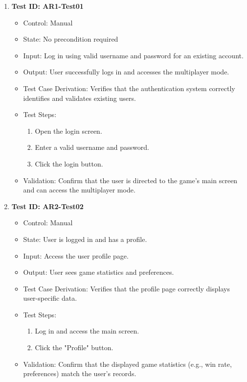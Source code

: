 \documentclass[12pt, titlepage]{article}
\begin{document}
\begin{enumerate}
    \item \textbf{Test ID: AR1-Test01}
        \begin{itemize}
            \item Control: Manual
            \item State: No precondition required
            \item Input: Log in using valid username and password for an existing account.
            \item Output: User successfully logs in and accesses the multiplayer mode.
            \item Test Case Derivation: Verifies that the authentication system correctly identifies and validates existing users.
            \item Test Steps:
                \begin{enumerate}
                    \item Open the login screen.
                    \item Enter a valid username and password.
                    \item Click the login button.
                \end{enumerate}
            \item Validation: Confirm that the user is directed to the game’s main screen and can access the multiplayer mode.
        \end{itemize}

    \item \textbf{Test ID: AR2-Test02}
        \begin{itemize}
            \item Control: Manual
            \item State: User is logged in and has a profile.
            \item Input: Access the user profile page.
            \item Output: User sees game statistics and preferences.
            \item Test Case Derivation: Verifies that the profile page correctly displays user-specific data.
            \item Test Steps:
                \begin{enumerate}
                    \item Log in and access the main screen.
                    \item Click the "Profile" button.
                \end{enumerate}
            \item Validation: Confirm that the displayed game statistics (e.g., win rate, preferences) match the user’s records.
        \end{itemize}
\end{enumerate}
\end{document}
